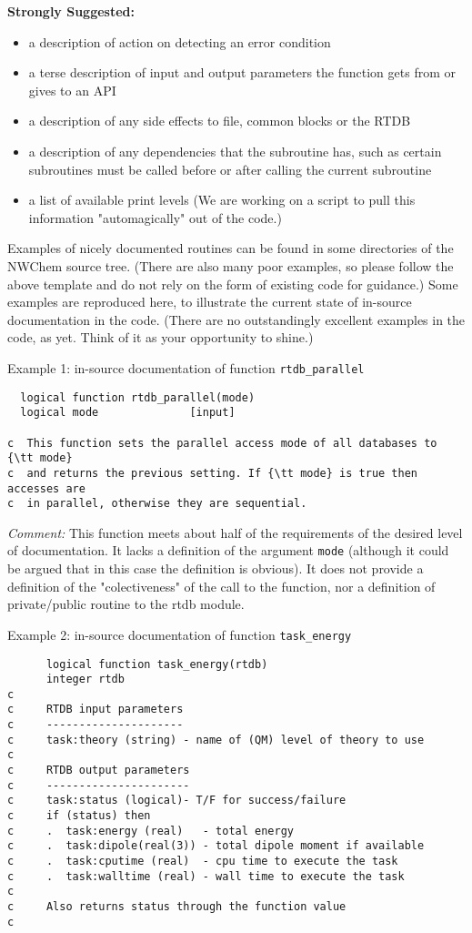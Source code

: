 {\bf Strongly Suggested:}
\begin{itemize}
\item a description of action on detecting an error condition
\item a terse description of input and output parameters the function
gets from or gives to an API
\item a description of any side effects to file, common blocks or the RTDB
\item a description of any dependencies that the subroutine has, such as
      certain subroutines must be called before or after calling the current 
      subroutine
\item a list of available print levels (We are working on a script to pull this information
"automagically" out of the code.)
\end{itemize}

Examples of nicely documented routines can be found in some directories of
the NWChem source tree.  (There are also many poor examples, so please follow
the above template and do not rely
on the form of existing code for guidance.)  Some examples are reproduced
here, to illustrate the current state of in-source documentation in the code.  
(There are no 
outstandingly excellent examples in the code, as yet.  Think of it as your
opportunity to shine.)

Example 1: in-source documentation of function {\tt rtdb\_parallel}


\begin{verbatim}
  logical function rtdb_parallel(mode)
  logical mode              [input]

c  This function sets the parallel access mode of all databases to {\tt mode} 
c  and returns the previous setting. If {\tt mode} is true then accesses are 
c  in parallel, otherwise they are sequential.
\end{verbatim}

{\em Comment:} This function meets about half of the requirements of the
desired level of documentation.  It lacks a definition of the argument {\tt mode}
(although it could be argued that in this case the definition is obvious).
It does not provide a definition
of the "colectiveness" of the call to the function, nor a definition of
private/public routine to the rtdb module.


Example 2: in-source documentation of function {\tt task\_energy}


\begin{verbatim}
      logical function task_energy(rtdb)
      integer rtdb
c
c     RTDB input parameters
c     ---------------------
c     task:theory (string) - name of (QM) level of theory to use
c     
c     RTDB output parameters
c     ----------------------
c     task:status (logical)- T/F for success/failure
c     if (status) then
c     .  task:energy (real)   - total energy
c     .  task:dipole(real(3)) - total dipole moment if available
c     .  task:cputime (real)  - cpu time to execute the task
c     .  task:walltime (real) - wall time to execute the task
c
c     Also returns status through the function value
c
\end{verbatim}


